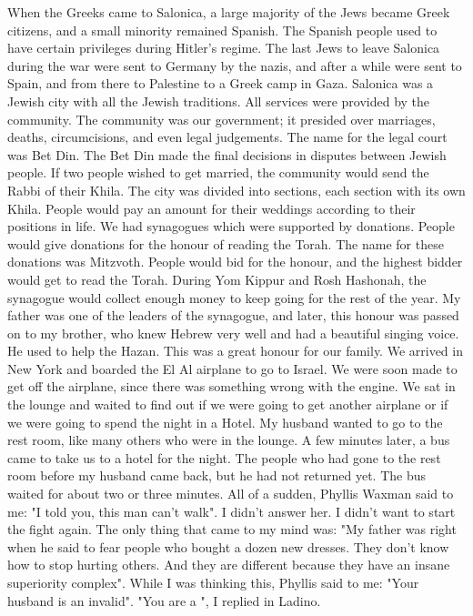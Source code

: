 When the Greeks came to Salonica, a large majority of the Jews became Greek citizens, and a small minority remained Spanish.
The Spanish people used to have certain privileges during Hitler's regime.
The last Jews to leave Salonica during the war were sent to Germany by the nazis, and after a while were sent to Spain, and from there to Palestine to a Greek camp in Gaza.
Salonica was a Jewish city with all the Jewish traditions.
All services were provided by the community.
The community was our government; it presided over marriages, deaths, circumcisions, and even legal judgements.
The name for the legal court was Bet Din.
The Bet Din made the final decisions in disputes between Jewish people.
If two people wished to get married, the community would send the Rabbi of their Khila.
The city was divided into sections, each section with its own Khila.
People would pay an amount for their weddings according to their positions in life.
We had synagogues which were supported by donations.
People would give donations for the honour of reading the Torah.
The name for these donations was Mitzvoth.
People would bid for the honour, and the highest bidder would get to read the Torah.
During Yom Kippur and Rosh Hashonah, the synagogue would collect enough money to keep going for the rest of the year.
My father was one of the leaders of the synagogue, and later, this honour was passed on to my brother, who knew Hebrew very well and had a beautiful singing voice.
He used to help the Hazan.
This was a great honour for our family.
We arrived in New York and boarded the El Al airplane to go to Israel.
We were soon made to get off the airplane, since there  was something wrong with the engine.
We sat in the lounge and waited to find out if we were going to get another airplane or if we were going to spend the night in a Hotel.
My husband wanted to go to the rest room, like many others who were in the lounge.
A few minutes later, a bus came to take us to a hotel for the night.
The people who had gone to the rest room before my husband came back, but he had not returned yet.
The bus waited for about two or three minutes.
All of a sudden, Phyllis Waxman said to me: "I told you, this man can't walk".
I didn't answer her.
I didn't want to start the fight again.
The only thing that came to my mind was: "My father was right when he said to fear people who bought a dozen new dresses.
They don't know how to stop hurting others.
And they are different because they have an insane superiority complex".
While I was thinking this, Phyllis said to me: "Your husband is an invalid".
"You are a ", I replied in Ladino.
